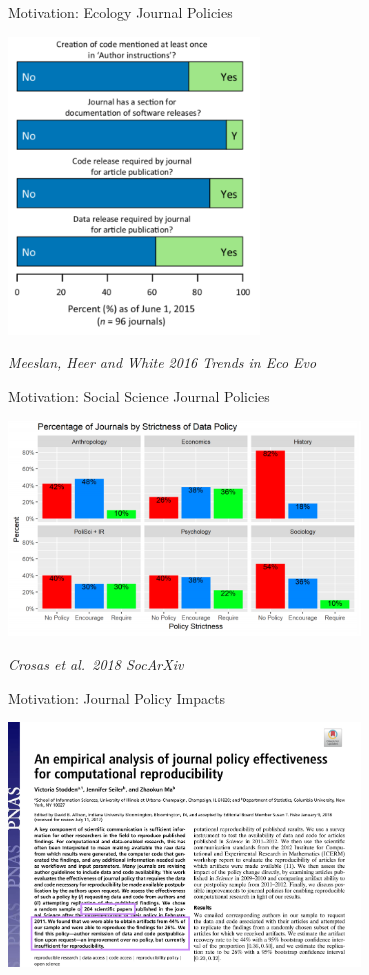 \documentclass[ignorenonframetext,]{beamer}
\begin{document}
\begin{frame}{Motivation: Ecology Journal Policies}
\protect\hypertarget{motivation-ecology-journal-policies}{}

\includegraphics[width=0.5\textwidth,height=\textheight]{white2016.png}

\emph{Meeslan, Heer and White 2016 Trends in Eco Evo}

\end{frame}

\begin{frame}{Motivation: Social Science Journal Policies}
\protect\hypertarget{motivation-social-science-journal-policies}{}

\includegraphics[width=0.7\textwidth,height=\textheight]{crosas2018.png}

\emph{Crosas et al.~2018 SocArXiv}

\end{frame}

\begin{frame}{Motivation: Journal Policy Impacts}
\protect\hypertarget{motivation-journal-policy-impacts}{}

\includegraphics[width=0.7\textwidth,height=\textheight]{Stodden2018front.png}

\end{frame}
\end{document}
